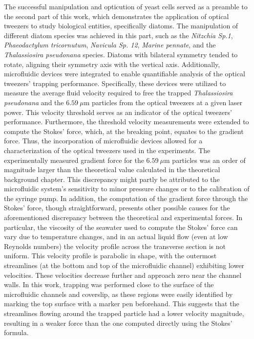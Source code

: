 \documentclass[letterpaper,12pt,oneside]{book}
\begin{document}
\newline 
The successful manipulation and opticution of yeast cells served as a preamble to the second part of this work, which demonstrates the application of optical tweezers to study biological entities, specifically diatoms. %
The manipulation of different diatom species was achieved in this part, such as the \textit{Nitzchia Sp.1}, \textit{Phaeodactylum tricornutum}, \textit{Navicula Sp. 12}, \textit{Marine pennate}, and the \textit{Thalassiosira pseudonana} species. Diatoms with bilateral symmetry tended to rotate, aligning their symmetry axis with the vertical axis.
Additionally, microfluidic devices were integrated to enable quantifiable analysis of the optical tweezers' trapping performance. Specifically, these devices were utilized to measure the average fluid velocity required to free the trapped \textit{Thalassiosira pseudonana} and the $6.59~\mu\text{m}$ particles from the optical tweezers at a given laser power. This velocity threshold serves as an indicator of the optical tweezers' performance. Furthermore, the threshold velocity measurements were extended to compute the Stokes' force, which, at the breaking point, equates to the gradient force. Thus, the incorporation of microfluidic devices allowed for a characterization of the optical tweezers used in the experiments. The experimentally measured gradient force for the $6.59~\mu\text{m}$ particles was an order of magnitude larger than the theoretical value calculated in the theoretical background chapter. This discrepancy might partly be attributed to the microfluidic system's sensitivity to minor pressure changes or to the calibration of the syringe pump. In addition, the computation of the gradient force through the Stokes' force, though straightforward, presents other possible causes for the aforementioned discrepancy between the theoretical and experimental forces. In particular, the viscosity of the seawater used to compute the Stokes' force can vary due to temperature changes, and in an actual liquid flow (even at low Reynolds numbers) the velocity profile across the transverse section is not uniform. This velocity profile is parabolic in shape, with the outermost streamlines (at the bottom and top of the microfluidic channel) exhibiting lower velocities. These velocities decrease further and approach zero near the channel walls. In this work, trapping was performed close to the surface of the microfluidic channels and coverslip, as these regions were easily identified by marking the top surface with a marker pen beforehand. This suggests that the streamlines flowing around the trapped particle had a lower velocity magnitude, resulting in a weaker force than the one computed directly using the Stokes' formula.
\end{document}
